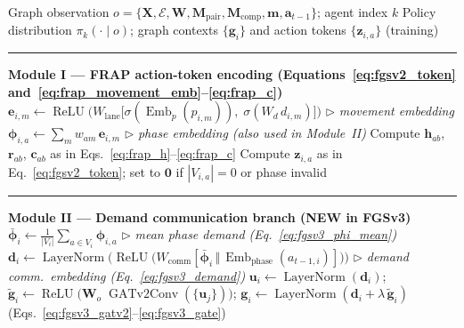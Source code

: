 \begin{algorithm}[ht]
  \caption{FGS Forward Pass (Module I: FRAP action tokens; Module II: GATv2 on demand $\mathbf{d}_i$; Module III: factored critic)}
  \label{alg:fgs_forward}
  \begin{algorithmic}[1]
    \Require Graph observation $o = \{\mathbf{X},\mathcal{E},\mathbf{W},\mathbf{M}_{\text{pair}},\mathbf{M}_{\text{comp}},\mathbf{m},\mathbf{a}_{t-1}\}$; agent index $k$
    \Ensure Policy distribution $\pi_k(\cdot\mid o)$; graph contexts $\{\mathbf{g}_i\}$ and action tokens $\{\mathbf{z}_{i,a}\}$ (training)
    \Statex \rule{\linewidth}{0.3pt}
    \Statex \textbf{Module I — FRAP action-token encoding (Equations~\ref{eq:fgsv2_token} and~\ref{eq:frap_movement_emb}--\ref{eq:frap_c})}
    \State $\mathbf{e}_{i,m} \leftarrow \operatorname{ReLU}\!\bigl(W_{\text{lane}}\bigl[\sigma(\operatorname{Emb}_p(p_{i,m})),\;\sigma(W_d\,d_{i,m})\bigr]\bigr)$
    \hfill\(\triangleright\) \textit{movement embedding}
    \EndFor
    \State $\boldsymbol{\phi}_{i,a} \leftarrow \sum_m w_{am}\,\mathbf{e}_{i,m}$
    \hfill\(\triangleright\) \textit{phase embedding (also used in Module~II)}
    \State Compute $\mathbf{h}_{ab}$, $\mathbf{r}_{ab}$, $\mathbf{c}_{ab}$ as in Eqs.~\ref{eq:frap_h}--\ref{eq:frap_c}
    \EndFor
    \State Compute $\mathbf{z}_{i,a}$ as in Eq.~\ref{eq:fgsv2_token}; set to $\mathbf{0}$ if $|V_{i,a}|=0$ or phase invalid
    \EndFor
    \Statex \rule{\linewidth}{0.3pt}
    \Statex \textbf{Module II — Demand communication branch (NEW in FGSv3)}
    \State $\bar{\boldsymbol{\phi}}_i \leftarrow \tfrac{1}{|V_i|}\textstyle\sum_{a \in V_i} \boldsymbol{\phi}_{i,a}$
    \hfill\(\triangleright\) \textit{mean phase demand (Eq.~\ref{eq:fgsv3_phi_mean})}
    \State $\mathbf{d}_i \leftarrow \operatorname{LayerNorm}\!\bigl(\operatorname{ReLU}\!\bigl(W_{\mathrm{comm}}[\bar{\boldsymbol{\phi}}_i \,\Vert\, \operatorname{Emb}_{\mathrm{phase}}(a_{t-1,i})]\bigr)\bigr)$
    \hfill\(\triangleright\) \textit{demand comm.\ embedding (Eq.~\ref{eq:fgsv3_demand})}
    \State $\mathbf{u}_i \leftarrow \operatorname{LayerNorm}(\mathbf{d}_i)$; \;
    $\tilde{\mathbf{g}}_i \leftarrow \operatorname{ReLU}\!\bigl(\mathbf{W}_o\;\operatorname{GATv2Conv}(\{\mathbf{u}_j\})\bigr)$; \;
    $\mathbf{g}_i \leftarrow \operatorname{LayerNorm}(\mathbf{d}_i + \lambda\,\tilde{\mathbf{g}}_i)$
    \hfill (Eqs.~\ref{eq:fgsv3_gatv2}--\ref{eq:fgsv3_gate})

\end{algorithmic}
\end{algorithm}
